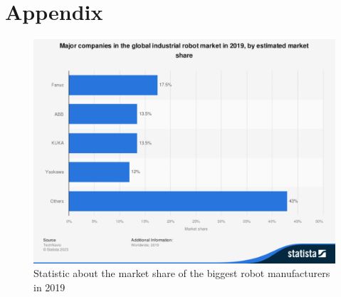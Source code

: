 \documentclass[conference]{IEEEtran}
\begin{document}



\nocite{*}

\cleardoublepage
\appendix

\section{Appendix}
    \begin{figure}[htbp!]
        \centering
        \includegraphics[scale=0.25]{./Moderne_Konzepte_Quellen/Citavi Attachments/statistic_id317178_global-industrial-robot-market-major-companies-by-market-share-2019.pdf}
        \caption{Statistic about the market share of the biggest robot manufacturers in 2019 \cite{s1}}
        \label{fig}
    \end{figure}
\end{document}
